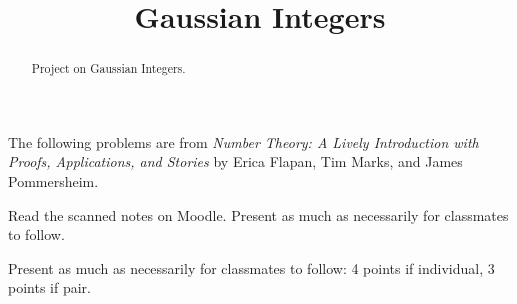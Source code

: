 \documentclass[letterpaper, 11 pt,handout]{ximera}
\title{Gaussian Integers}
\begin{document}
\begin{abstract}
 Project on Gaussian Integers.
\end{abstract}
\maketitle

The following problems are from \emph{Number Theory: A Lively Introduction with Proofs, Applications, and Stories} by Erica Flapan, Tim Marks, and James Pommersheim.

	Read the scanned notes on Moodle. Present as much as necessarily for classmates to follow.
	
\begin{rubric}
 	Present as much as necessarily for classmates to follow: 4 points if individual, 3 points if pair.
\end{rubric}
\end{document}
